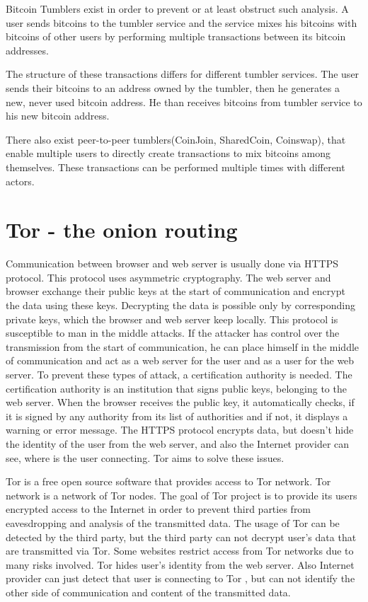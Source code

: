 \documentclass[
  digital, %
  table,   %
  lof,     %
  lot,     %
  oneside
]{fithesis3}
\begin{document}
Bitcoin Tumblers exist in order to prevent or at least obstruct such analysis.
A user sends bitcoins to the tumbler service and the service mixes his bitcoins
with bitcoins of other users by performing multiple transactions
between its bitcoin addresses. \parencite{moser2013inquiry}
  
The structure of these transactions differs for different tumbler services.
The user sends their bitcoins to an address owned by the tumbler,
then he generates a new, never used bitcoin address.
He than receives bitcoins from tumbler service to his new bitcoin address.

There also exist peer-to-peer tumblers(CoinJoin, SharedCoin, Coinswap),
that enable multiple users to directly create transactions to mix bitcoins among themselves.
These transactions can be performed multiple times with different actors.

\section{Tor - the onion routing}

Communication between browser and web server is usually done via HTTPS protocol.
This protocol uses asymmetric cryptography. The web server and browser exchange their public keys at the start of communication
and encrypt the data using these keys. Decrypting the data is possible only by corresponding private keys,
which the browser and web server keep locally. This protocol is susceptible to man in the middle attacks.
If the attacker has control over the transmission from the start of communication, he can place himself in the middle of communication and act as a web server for the user and as a user for the web server. To prevent these types of attack,
 a certification authority is needed. The certification authority is an institution that signs public keys, belonging to the web server.
 When the browser receives the public key, it automatically checks, if it is signed by any authority from its list of authorities and if not,
 it displays a warning or error message.
The HTTPS protocol encrypts data, but doesn't hide the identity of the user from the web server,
 and also the Internet provider can see, where is the user connecting. Tor aims to solve these issues.
 
Tor \parencite{dingledine2004tor} is a free open source software that provides access to Tor network. Tor network is a network of Tor nodes.
The goal of Tor project is to provide its users encrypted access to the Internet in order to prevent third parties
from eavesdropping and analysis of the transmitted data.
The usage of Tor can be detected by the third party, but the third party can not decrypt user's data that are transmitted
 via Tor. Some websites restrict access from Tor networks due to many risks involved.
Tor hides user's identity from the web server. Also Internet provider can just detect that user is connecting to Tor
, but can not identify the other side of communication and content of the transmitted data.
\end{document}
